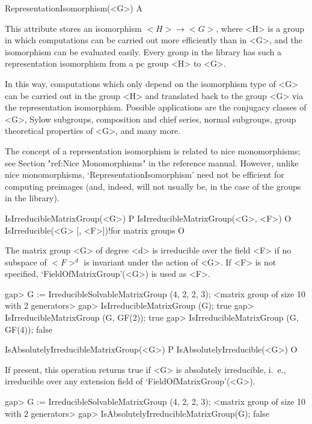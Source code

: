 \>RepresentationIsomorphism(<G>) A

This attribute stores an isomorphism $<H> \to <G>$, where <H> is a group
in which computations can be carried out more efficiently than in <G>, and 
the isomorphism can be evaluated easily. Every group in the {\IRREDSOL} library
has such a representation isomorphism from a pc group <H> to <G>.

In this way, computations which only depend on the 
isomorphism type of <G> can be carried out in the group <H> and translated
back to the group <G> via the representation isomorphism. Possible applications are the conjugacy classes of <G>, Sylow subgroups, composition and chief series, normal subgroups, group theoretical properties of <G>, and many more. 

The concept of a representation isomorphism is related to 
nice monomorphisms; see Section "ref:Nice Monomorphisms" in the {\GAP} 
reference manual. However, unlike nice monomorphisms, 
`RepresentationIsomorphism' need not be efficient for computing preimages (and, indeed, will not usually be, in the case of the groups in the {\IRREDSOL} library). 



\>IsIrreducibleMatrixGroup(<G>) P
\>IsIrreducibleMatrixGroup(<G>, <F>) O
\>IsIrreducible(<G> [, <F>])!{for matrix groups} O

The matrix group <G> of degree <d> is irreducible over the field <F> if no subspace of $<F>^d$ is
invariant under the action of <G>. If <F> is not
specified, `FieldOfMatrixGroup'(<G>) is used as <F>.

\beginexample
gap> G := IrreducibleSolvableMatrixGroup (4, 2, 2, 3);
<matrix group of size 10 with 2 generators>
gap> IsIrreducibleMatrixGroup (G);
true
gap> IsIrreducibleMatrixGroup (G, GF(2));
true
gap> IsIrreducibleMatrixGroup (G, GF(4));
false
\endexample

\>IsAbsolutelyIrreducibleMatrixGroup(<G>) P
\>IsAbsolutelyIrreducible(<G>) O

If present, this operation returns true if <G> is absolutely irreducible, i.~e., irreducible over any
extension field of `FieldOfMatrixGroup'(<G>).

\beginexample
gap> G := IrreducibleSolvableMatrixGroup (4, 2, 2, 3);
<matrix group of size 10 with 2 generators>
gap> IsAbsolutelyIrreducibleMatrixGroup(G);
false
\endexample

